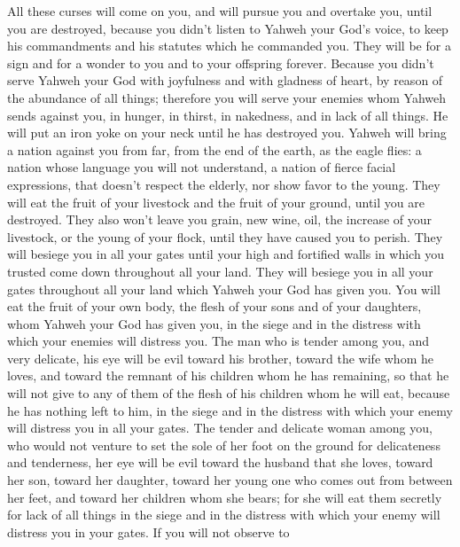  All these curses will come on you, and will pursue you
and overtake you, until you are destroyed, because you didn't listen to
Yahweh your God's voice, to keep his commandments and his statutes which
he commanded you.  They will be for a sign and for a
wonder to you and to your offspring forever.  Because you
didn't serve Yahweh your God with joyfulness and with gladness of heart,
by reason of the abundance of all things;  therefore you
will serve your enemies whom Yahweh sends against you, in hunger, in
thirst, in nakedness, and in lack of all things. He will put an iron
yoke on your neck until he has destroyed you.  Yahweh
will bring a nation against you from far, from the end of the earth, as
the eagle flies: a nation whose language you will not understand,
 a nation of fierce facial expressions, that doesn't
respect the elderly, nor show favor to the young.  They
will eat the fruit of your livestock and the fruit of your ground, until
you are destroyed. They also won't leave you grain, new wine, oil, the
increase of your livestock, or the young of your flock, until they have
caused you to perish.  They will besiege you in all your
gates until your high and fortified walls in which you trusted come down
throughout all your land. They will besiege you in all your gates
throughout all your land which Yahweh your God has given you.
 You will eat the fruit of your own body, the flesh of
your sons and of your daughters, whom Yahweh your God has given you, in
the siege and in the distress with which your enemies will distress you.
 The man who is tender among you, and very delicate, his
eye will be evil toward his brother, toward the wife whom he loves, and
toward the remnant of his children whom he has remaining,
 so that he will not give to any of them of the flesh of
his children whom he will eat, because he has nothing left to him, in
the siege and in the distress with which your enemy will distress you in
all your gates.  The tender and delicate woman among you,
who would not venture to set the sole of her foot on the ground for
delicateness and tenderness, her eye will be evil toward the husband
that she loves, toward her son, toward her daughter, 
toward her young one who comes out from between her feet, and toward her
children whom she bears; for she will eat them secretly for lack of all
things in the siege and in the distress with which your enemy will
distress you in your gates.  If you will not observe to
